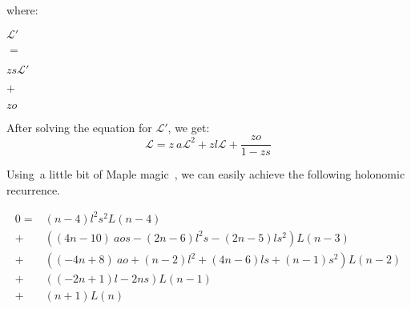 \documentclass[final]{article}
\theoremstyle{definition}
\theoremstyle{definition}
\theoremstyle{remark}
\newcommand{\gf}[1]{\ensuremath{\mathcal{#1}}}
\begin{document}
where:

\begin{center}
    \begin{minipage}[t]{.2\textwidth}
        \begin{center}
            \(\gf{L'}\)\\
        \end{center}
    \end{minipage}%
    \begin{minipage}[t]{.05\textwidth}
        \begin{center}
            \(=\)\\
        \end{center}
    \end{minipage}%
    \begin{minipage}[t]{.2\textwidth}
        \begin{center}
            \(z s \gf{L'}\)\\
        \end{center}
    \end{minipage}%
    \begin{minipage}[t]{.05\textwidth}
        \begin{center}
            \(+\)\\
        \end{center}
    \end{minipage}%
    \begin{minipage}[t]{.2\textwidth}
        \begin{center}
            \(z o\)\\
        \end{center}
    \end{minipage}%
\end{center}

After solving the equation for \(\gf{L'}\), we get:
\[\gf{L} = z~a \gf{L}^2 + z l \gf{L} + \frac{z o}{1 - z s}\]

Using~a little bit of Maple magic~\cite{gfun}, we can easily achieve the following holonomic recurrence.

\[\begin{array}{rl}
        0 =& (n - 4) l^2 s^2 L(n - 4)\\
        +& ((4 n - 10)~a o s - (2 n - 6) l^2 s - (2 n - 5) l s^2) L(n - 3)\\
        +& ((-4 n + 8)~a o + (n - 2) l^2 + (4 n - 6) l s + (n - 1) s^2) L(n - 2)\\
        +& ((-2 n + 1) l - 2 n s) L(n - 1)\\
        +& (n + 1) L(n)
\end{array}\]
\end{document}
